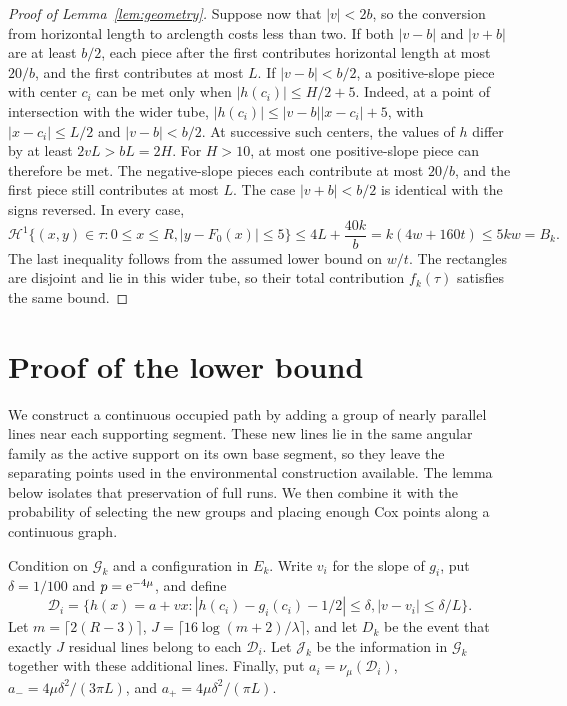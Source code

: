 \documentclass[11pt,letterpaper]{article}
\begin{document}
\begin{proof}[Proof of Lemma~\ref{lem:geometry}]
Suppose now that $|v|<2b$, so the conversion from horizontal length to arclength costs less than two. If both $|v-b|$ and $|v+b|$ are at least $b/2$, each piece after the first contributes horizontal length at most $20/b$, and the first contributes at most $L$. If $|v-b|<b/2$, a positive-slope piece with center $c_i$ can be met only when $|h(c_i)|\le H/2+5$. Indeed, at a point of intersection with the wider tube, $|h(c_i)|\le |v-b||x-c_i|+5$, with $|x-c_i|\le L/2$ and $|v-b|<b/2$. At successive such centers, the values of $h$ differ by at least $2vL>bL=2H$. For $H>10$, at most one positive-slope piece can therefore be met. The negative-slope pieces each contribute at most $20/b$, and the first piece still contributes at most $L$. The case $|v+b|<b/2$ is identical with the signs reversed. In every case,
\[
 \mathcal H^1\{(x,y)\in\tau:0\le x\le R, |y-F_0(x)|\le5\}
 \le4L+\frac{40k}{b}=k(4w+160t)\le5kw=B_k.
\]
The last inequality follows from the assumed lower bound on $w/t$. The rectangles are disjoint and lie in this wider tube, so their total contribution $f_k(\tau)$ satisfies the same bound.
\end{proof}

\section{Proof of the lower bound}

We construct a continuous occupied path by adding a group of nearly parallel lines near each supporting segment. These new lines lie in the same angular family as the active support on its own base segment, so they leave the separating points used in the environmental construction available. The lemma below isolates that preservation of full runs. We then combine it with the probability of selecting the new groups and placing enough Cox points along a continuous graph.

Condition on $\mathcal G_k$ and a configuration in $E_k$. Write $v_i$ for the slope of $g_i$, put $\delta=1/100$ and $p=\mathrm{e}^{-4\mu}$, and define
\begin{equation}\label{eq:additional}
 \mathscr D_i=\{h(x)=a+vx:
       |h(c_i)-g_i(c_i)-1/2|\le\delta, |v-v_i|\le\delta/L\}.
\end{equation}
Let $m=\lceil2(R-3)\rceil$, $J=\lceil16\log(m+2)/\lambda\rceil$, and let $D_k$ be the event that exactly $J$ residual lines belong to each $\mathscr D_i$. Let $\mathcal J_k$ be the information in $\mathcal G_k$ together with these additional lines. Finally, put $a_i=\nu_\mu(\mathscr D_i)$, $a_-=4\mu\delta^2/(3\pi L)$, and $a_+=4\mu\delta^2/(\pi L)$.
\end{document}
